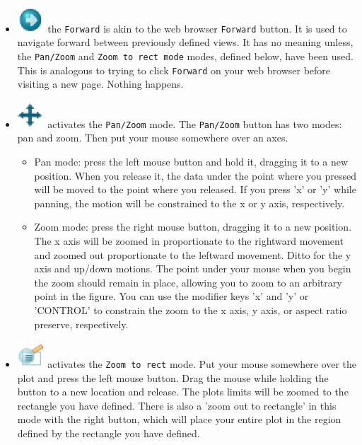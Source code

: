 \documentclass[a4paper,11pt]{report}
\begin{document}
\begin{itemize}
\begin{itemize}
\item \includegraphics[width=1cm]{Figures/matplotlib_forward.eps} the \texttt{Forward} is akin to the web browser 
\texttt{Forward} button. It is used to navigate forward between previously defined views. It has no meaning unless, 
the \texttt{Pan/Zoom} and \texttt{Zoom to rect mode} modes, defined below, have been used. This is analogous to trying to 
click \texttt{Forward} on your web browser before visiting a new page. Nothing happens.

\item \includegraphics[width=1cm]{Figures/matplotlib_move.eps} activates the \texttt{Pan/Zoom} mode. 
The \texttt{Pan/Zoom} button has two modes: pan and zoom. Then put your mouse somewhere over an axes.
\begin{itemize}
\item Pan mode: press the left mouse button and hold it, dragging it to a new position. When you release it, the data under 
the point where you pressed will be moved to the point where you released. If you press 'x' or 'y' while panning, the motion 
will be constrained to the x or y axis, respectively.
\item Zoom mode: press the right mouse button, dragging it to a new position. The x axis will be zoomed in proportionate to 
the rightward movement and zoomed out proportionate to the leftward movement. Ditto for the y axis and up/down motions. The 
point under your mouse when you begin the zoom should remain in place, allowing you to zoom to an arbitrary point in the 
figure. You can use the modifier keys 'x' and 'y' or 'CONTROL' to constrain the zoom to the x axis, y axis, or aspect ratio 
preserve, respectively.
\end{itemize}

\item \includegraphics[width=1cm]{Figures/matplotlib_zoom_to_rect.eps} activates the 
\texttt{Zoom to rect} mode. Put your mouse somewhere over the plot and press the left mouse button. Drag the mouse while 
holding the button to a new location and release. The plots limits will be zoomed to the rectangle you have defined. There is 
also a 'zoom out to rectangle' in this mode with the right button, which will place your entire plot in the region defined 
by the rectangle you have defined.


\end{itemize}
\end{itemize}
\end{document}
